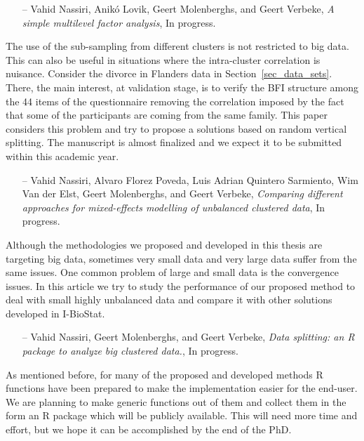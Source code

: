 \documentclass[14pt]{article}
\begin{document}
\begin{itemize}
\item[--]{\textsf{Vahid Nassiri, Anik\'{o} Lovik, Geert Molenberghs, and Geert Verbeke}}, {\it A simple multilevel factor analysis}, In progress.
\end{itemize}
The use of the sub-sampling from different clusters is not restricted to big data. This can also be useful in situations where the intra-cluster correlation is nuisance. Consider the divorce in Flanders data in Section~\ref{sec_data_sets}. There, the main interest, at validation stage, is to verify the BFI structure among the 44 items of the questionnaire removing the correlation imposed by the fact that some of the participants are coming from the same family. This paper considers this problem and try to propose a solutions based on random vertical splitting. The manuscript is almost finalized and we expect it to be submitted within this academic year.


\begin{itemize}
\item[--]{\textsf{Vahid Nassiri, Alvaro Florez Poveda, Luis Adrian Quintero Sarmiento, Wim Van der Elst, Geert Molenberghs, and Geert Verbeke}}, {\it Comparing different approaches for mixed-effects modelling of unbalanced clustered data}, In progress.
\end{itemize}
Although the methodologies we proposed and developed in this thesis are targeting big data, sometimes very small data and very large data suffer from the same issues. One common problem of large and small data is the convergence issues. In this article we try to study the performance of our proposed method to deal with small highly unbalanced data and compare it with other solutions developed in I-BioStat.


\begin{itemize}
\item[--]{\textsf{Vahid Nassiri, Geert Molenberghs, and Geert Verbeke}}, {\it Data splitting: an \textsf{R} package to analyze big clustered data.}, In progress.
\end{itemize}
As mentioned before, for many of the proposed and developed methods \textsf{R} functions have been prepared to make the implementation easier for the end-user. We are planning to make generic functions out of them and collect them in the form an \textsf{R} package which will be publicly available. This will need more time and effort, but we hope it can be accomplished by the end of the PhD.
\end{document}
